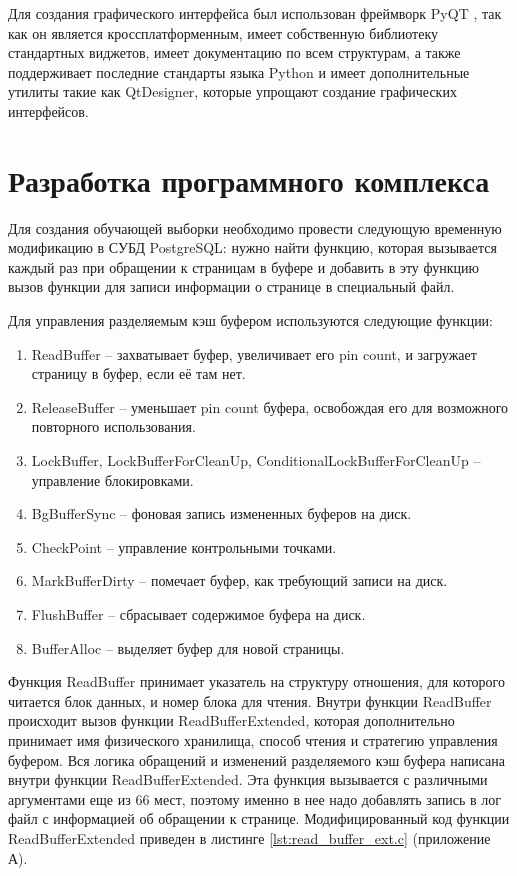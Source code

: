 Для создания графического интерфейса был использован фреймворк PyQT \cite{qt}, так как он является кроссплатформенным, имеет собственную библиотеку стандартных виджетов, имеет документацию по всем структурам, а также поддерживает последние стандарты языка Python и имеет дополнительные утилиты такие как QtDesigner, которые упрощают создание графических интерфейсов.

\section{Разработка программного комплекса}

Для создания обучающей выборки необходимо провести следующую временную модификацию в СУБД PostgreSQL: нужно найти функцию, которая вызывается каждый раз при обращении к страницам в буфере и добавить в эту функцию вызов функции для записи информации о странице в специальный файл.

Для управления разделяемым кэш буфером используются следующие функции:
\begin{enumerate}
	\item ReadBuffer -- захватывает буфер, увеличивает его pin count, и загружает страницу в буфер, если её там нет.
	\item ReleaseBuffer -- уменьшает pin count буфера, освобождая его для возможного повторного использования.
	\item LockBuffer, LockBufferForCleanUp, ConditionalLockBufferForCleanUp -- управление блокировками.
	\item BgBufferSync -- фоновая запись измененных буферов на диск.
	\item CheckPoint -- управление контрольными точками.
	\item MarkBufferDirty -- помечает буфер, как требующий записи на диск.
	\item FlushBuffer -- сбрасывает содержимое буфера на диск.
	\item BufferAlloc -- выделяет буфер для новой страницы.
\end{enumerate}

Функция ReadBuffer принимает указатель на структуру отношения, для которого читается блок данных, и номер блока для чтения.
Внутри функции ReadBuffer происходит вызов функции ReadBufferExtended, которая дополнительно принимает имя физического хранилища, способ чтения и стратегию управления буфером.
Вся логика обращений и изменений разделяемого кэш буфера написана внутри функции ReadBufferExtended.
Эта функция вызывается с различными аргументами еще из 66 мест, поэтому именно в нее надо добавлять запись в лог файл с информацией об обращении к странице.
Модифицированный код функции ReadBufferExtended приведен в листинге \ref{lst:read_buffer_ext.c} (приложение А).

